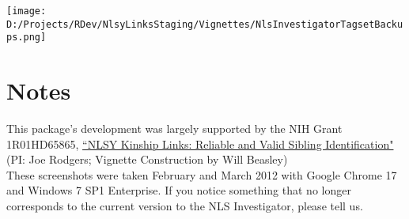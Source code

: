 \documentclass{article}\usepackage[]{graphicx}\usepackage[]{color}
\begin{document}
\texttt{[image: D:/Projects/RDev/NlsyLinksStaging/Vignettes/NlsInvestigatorTagsetBackups.png]}

\section{Notes}
This package's development was largely supported by the NIH Grant 1R01HD65865,  \href{http://taggs.hhs.gov/AwardDetail.cfm?s_Award_Num=R01HD065865&n_Prog_Office_Code=50}{``NLSY Kinship Links: Reliable and Valid Sibling Identification"} (PI: Joe Rodgers; Vignette Construction by Will Beasley)\\


These screenshots were taken February and March 2012 with Google Chrome 17 and Windows 7 SP1 Enterprise.  If you notice something that no longer corresponds to the current version to the NLS Investigator, please tell us.
\end{document}

